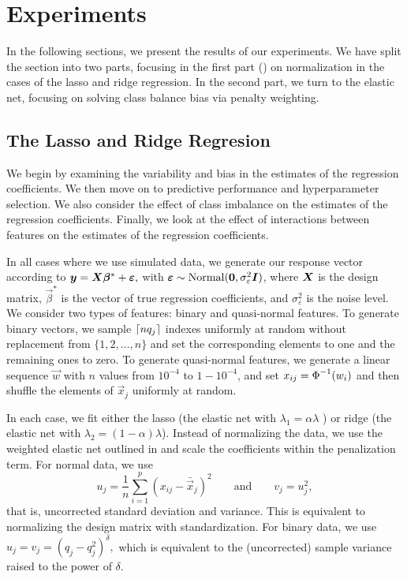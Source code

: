 \section{Experiments}
\label{sec:experiments}

In the following sections, we present the results of our experiments. We have split the
section into two parts, focusing in the first part () on
normalization in the cases of the lasso and ridge regression. In the second part, we turn
to the elastic net, focusing on solving class balance bias via penalty weighting.

\subsection{The Lasso and Ridge Regresion}\label{sec:experiments-lassoridge}

We begin by examining the variability and bias in the estimates of the regression
coefficients. We then move on to predictive performance and hyperparameter selection. We
also consider the effect of class imbalance on the estimates of the regression
coefficients. Finally, we look at the effect of interactions between features on the
estimates of the regression coefficients.

In all cases where we use simulated data, we generate our response vector according to
\(\boldsymbol{y} = \boldsymbol{X}\boldsymbol{\beta}^* + \boldsymbol{\varepsilon},\) with \(\boldsymbol{\varepsilon} \sim
\operatorname{Normal}(\boldsymbol{0}, \sigma_\varepsilon^2 \boldsymbol{I})\), where \(\boldsymbol{X}\) is the design matrix,
\(\vec{\beta}^*\) is the vector of true regression coefficients, and
\(\sigma_\varepsilon^2\) is the noise level. We consider two types of features: binary and
quasi-normal features. To generate binary vectors, we sample \(\lceil nq_j \rceil\) indexes
uniformly at random without replacement from \(\{1,2,\dots,n\}\) and set the corresponding
elements to one and the remaining ones to zero. To generate quasi-normal features, we
generate a linear sequence \(\vec{w}\) with \(n\) values from \(10^{-4}\) to \(1 -
10^{-4}\), and set \(x_{ij} = \operatorname{\Phi}^{-1}(w_i)\) and then shuffle the elements of
\(\vec{x}_j\) uniformly at random.

In each case, we fit either the lasso (the elastic net with \(\lambda_1 = \alpha \lambda\)
) or ridge (the elastic net with \(\lambda_2 = (1 - \alpha)\lambda\)). Instead of
normalizing the data, we use the weighted elastic net outlined in
 and scale the coefficients within the penalization term. For
normal data, we use
\[
  u_j = \frac{1}{n}\sum_{i=1}^p (x_{ij} - \bar{\vec{x}}_j)^2\qquad\text{and}\qquad v_j= u_j^2,
\]
that is, uncorrected standard deviation and variance. This is equivalent to normalizing the
design matrix with standardization. For binary data, we use \(u_j = v_j = (q_j -
q_j^2)^\delta,\) which is equivalent to the (uncorrected) sample variance raised to the
power of \(\delta\).

